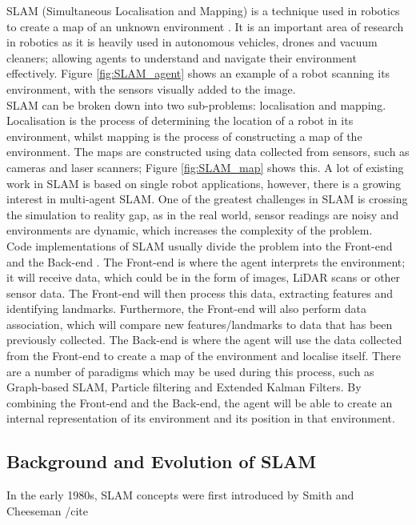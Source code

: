 \documentclass[12pt]{article}
\begin{document}
SLAM (Simultaneous Localisation and Mapping) is a technique used in robotics to create a map of an unknown environment \cite{SLAM_overview}.
It is an important area of research in robotics as it is heavily used in autonomous vehicles, drones and vacuum cleaners;
allowing agents to understand and navigate their environment effectively. Figure \ref{fig:SLAM_agent} shows an example of a
robot scanning its environment, with the sensors visually added to the image.\\
SLAM can be broken down into two sub-problems: localisation and mapping. Localisation is the process of determining the
location of a robot in its environment, whilst mapping is the process of constructing a map of the environment. The maps
are constructed using data collected from sensors, such as cameras and laser scanners; Figure \ref{fig:SLAM_map} shows this.
A lot of existing work in SLAM is based on single robot applications, however, there is a growing interest in multi-agent
SLAM. One of the greatest challenges in SLAM is crossing the simulation to reality gap, as in the real world, sensor
readings are noisy and environments are dynamic, which increases the complexity of the problem.\\
Code implementations of SLAM usually divide the problem into the Front-end and the Back-end \cite{SLAM_components}.
The Front-end is where the agent interprets the environment; it will receive data, which could be in the form of images,
LiDAR scans or other sensor data. The Front-end will then process this data, extracting features and identifying landmarks.
Furthermore, the Front-end will also perform data association, which will compare new features/landmarks to data that has
been previously collected. The Back-end is where the agent will use the data collected from the Front-end to create a map
of the environment and localise itself. There are a number of paradigms which may be used during this process, such as Graph-based
SLAM, Particle filtering and Extended Kalman Filters. By combining the Front-end and the Back-end, the agent will be able to
create an internal representation of its environment and its position in that environment.

\subsection{Background and Evolution of SLAM} %
In the early 1980s, SLAM concepts were first introduced by Smith and Cheeseman /cite{}
\end{document}
